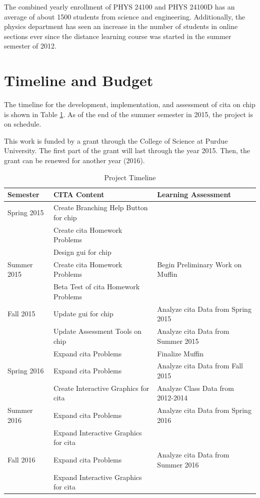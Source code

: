 The combined yearly enrollment of PHYS 24100 and PHYS 24100D has an average of about 1500 students from science and engineering. Additionally, the physics department has seen an increase in the number of students in online sections ever since the distance learning course was started in the summer semester of 2012.

\section{Timeline and Budget}

The timeline for the development, implementation, and assessment of \gls{cita} on \gls{chip} is shown in Table \ref{tab:timeline}. As of the end of the summer semester in 2015, the project is on schedule.

This work is funded by a grant through the College of Science at Purdue University. The first part of the grant will last through the year 2015. Then, the grant can be renewed for another year (2016).

\pagebreak

\begin{landscape}
\begin{table}[!ht]
  \centering
  \begin{tabular}{|l|l|l|}
    \hline
    \textbf{Semester} & \textbf{CITA Content} & \textbf{Learning Assessment}\\
	\hline
	Spring 2015 & Create Branching Help Button for \gls{chip} & \\
	& Create \gls{cita} Homework Problems & \\
	& Design \gls{gui} for \gls{chip} & \\
	\hline
	Summer 2015 & Create \gls{cita} Homework Problems & Begin Preliminary Work on Muffin\\
	& Beta Test of \gls{cita} Homework Problems &  \\
	\hline
	Fall 2015 & Update \gls{gui} for \gls{chip} & Analyze \gls{cita} Data from Spring 2015 \\
	& Update Assessment Tools on \gls{chip} & Analyze \gls{cita} Data from Summer 2015 \\
	& Expand \gls{cita} Problems & Finalize Muffin \\
	\hline
	Spring 2016 & Expand \gls{cita} Problems & Analyze \gls{cita} Data from Fall 2015 \\
	& Create Interactive Graphics for \gls{cita} & Analyze Class Data from 2012-2014 \\
	\hline
	Summer 2016 & Expand \gls{cita} Problems & Analyze \gls{cita} Data from Spring 2016 \\
	& Expand Interactive Graphics for \gls{cita} & \\
	\hline
	Fall 2016 & Expand \gls{cita} Problems & Analyze \gls{cita} Data from Summer 2016 \\
	& Expand Interactive Graphics for \gls{cita} & \\
	\hline
  \end{tabular}
  \caption{Project Timeline}
  \label{tab:timeline}
\end{table}
\end{landscape}
